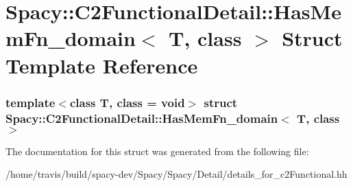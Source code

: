 \hypertarget{structSpacy_1_1C2FunctionalDetail_1_1HasMemFn__domain}{\section{\-Spacy\-:\-:\-C2\-Functional\-Detail\-:\-:\-Has\-Mem\-Fn\-\_\-domain$<$ \-T, class $>$ \-Struct \-Template \-Reference}
\label{structSpacy_1_1C2FunctionalDetail_1_1HasMemFn__domain}
}
\subsubsection*{template$<$class T, class = void$>$ struct Spacy\-::\-C2\-Functional\-Detail\-::\-Has\-Mem\-Fn\-\_\-domain$<$ T, class $>$}



\-The documentation for this struct was generated from the following file\-:\begin{DoxyCompactItemize}
\item 
/home/travis/build/spacy-\/dev/\-Spacy/\-Spacy/\-Detail/details\-\_\-for\-\_\-c2\-Functional.\-hh\end{DoxyCompactItemize}
